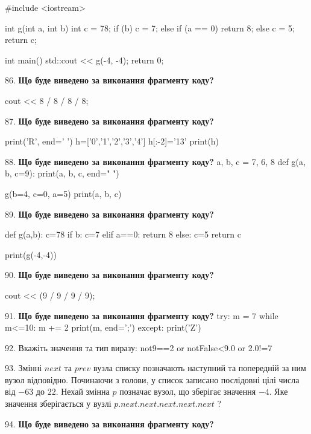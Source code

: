 \documentclass[11pt]{article}
\begin{document}
#include <iostream>

int g(int a, int b){
    int c = 78;
    if (b)
        c = 7;
    else if (a == 0)
         return 8;
    else 
        c = 5;
    return c;
}

int main(){
    std::cout << g(-4, -4);
    return 0;
}
\par\vspace{5mm}
86. \textbf{Що буде виведено за виконання фрагменту коду?}

cout << 8 / 8 / 8 / 8;
\par\vspace{5mm}
87. \textbf{Що буде виведено за виконання фрагменту коду?}

print('R', end=' ')
h=['0','1','2','3','4']
h[:-2]='13'
print(h)

\par\vspace{5mm}
88. \textbf{Що буде виведено за виконання фрагменту коду?}
a, b, c = 7, 6, 8
def g(a, b, c=9):
    print(a, b, c, end=" ")

g(b=4, c=0, a=5)
print(a, b, c)
\par\vspace{5mm}
89. \textbf{Що буде виведено за виконання фрагменту коду?}

def g(a,b):
    c=78
    if b:
        c=7
    elif a==0:
         return 8
    else: 
        c=5
    return c

print(g(-4,-4))
\par\vspace{5mm}
90. \textbf{Що буде виведено за виконання фрагменту коду?}

cout << (9 / 9 / 9 / 9);
\par\vspace{5mm}
91. \textbf{Що буде виведено за виконання фрагменту коду?}
try:
    m = 7
    while m<=10:
        m += 2
    print(m, end=';')
except:
    print('Z')
\par\vspace{5mm}
92. 
Вкажіть значення та тип виразу:
not9==2 or notFalse<9.0 or 2.0!=7
\par\vspace{5mm}
93. 
Змінні $next$ та $prev$ вузла списку позначають наступний та попередній за ним вузол відповідно. Починаючи з голови, у список записано послідовні цілі числа від $-63$ до $22$. Нехай змінна $p$ позначає вузол, що зберігає значення $-4$.
Яке значення зберігається у вузлі $p.next.next.next.next.next$ ?
\par\vspace{5mm}
94. \textbf{Що буде виведено за виконання фрагменту коду?}
\end{document}
